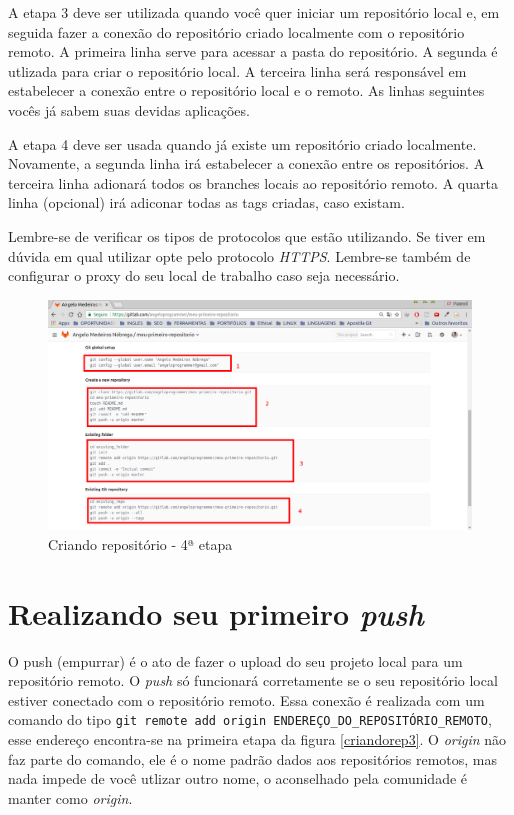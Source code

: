 \documentclass[12pt,openright,oneside,a4paper,english,brazil]{abntex2}
\begin{document}
A etapa 3 deve ser utilizada quando você quer iniciar um repositório local e, em seguida fazer a conexão do repositório criado localmente com o repositório remoto. A primeira linha serve para acessar a pasta do repositório. A segunda é utlizada para criar o repositório local. A terceira linha será responsável em estabelecer a conexão entre o repositório local e o remoto. As linhas seguintes vocês já sabem suas devidas aplicações.

A etapa 4 deve ser usada quando já existe um repositório criado localmente. Novamente, a segunda linha irá estabelecer a conexão entre os repositórios. A terceira linha adionará todos os branches locais ao repositório remoto. A quarta linha (opcional) irá adiconar todas as tags criadas, caso existam.

Lembre-se de verificar os tipos de protocolos que estão utilizando. Se tiver em dúvida em qual utilizar opte pelo protocolo \textit{HTTPS}. Lembre-se também de configurar o proxy do seu local de trabalho caso seja necessário.

\begin{figure}[h]
	\caption{\label{criandorep4}Criando repositório - 4ª etapa}
	\begin{center}
		\includegraphics[width=1\linewidth]{criandorep4}
	\end{center}
\end{figure}

\section{Realizando seu primeiro \textit{push}}

O push (empurrar) é o ato de fazer o upload do seu projeto local para um repositório remoto. O \textit{push} só funcionará corretamente se o seu repositório local estiver conectado com o repositório remoto. Essa conexão é realizada com um comando do tipo \verb|git remote add origin ENDEREÇO_DO_REPOSITÓRIO_REMOTO|, esse endereço encontra-se na primeira etapa da figura \ref{criandorep3}. O \textit{origin} não faz parte do comando, ele é o nome padrão dados aos repositórios remotos, mas nada impede de você utlizar outro nome, o aconselhado pela comunidade é manter como \textit{origin}.
\end{document}
